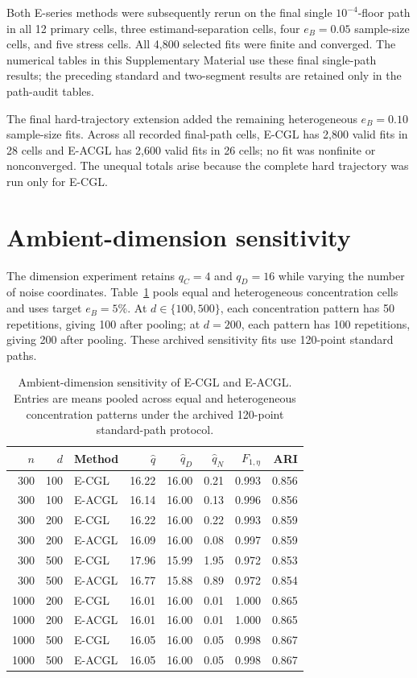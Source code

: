 \documentclass[preprint,12pt,authoryear]{elsarticle}
\begin{document}
Both E-series methods were subsequently rerun on the final single
$10^{-4}$-floor path in all 12 primary cells, three estimand-separation cells,
four $e_B=0.05$ sample-size cells, and five stress cells. All 4,800 selected
fits were finite and converged. The numerical tables in this Supplementary Material use
these final single-path results; the preceding standard and two-segment
results are retained only in the path-audit tables.

The final hard-trajectory extension added the remaining heterogeneous
$e_B=0.10$ sample-size fits. Across all recorded final-path cells, E-CGL has
2,800 valid fits in 28 cells and E-ACGL has 2,600 valid fits in 26 cells; no
fit was nonfinite or nonconverged. The unequal totals arise because the
complete hard trajectory was run only for E-CGL.

\section{Ambient-dimension sensitivity}
\label{sec:s-ambient-dimension}

The dimension experiment retains $q_C=4$ and $q_D=16$ while varying the number
of noise coordinates. Table~\ref{tab:s-ambient-dimension} pools equal and heterogeneous
concentration cells and uses target $e_B=5\%$. At $d\in\{100,500\}$, each
concentration pattern has 50 repetitions, giving 100 after pooling; at $d=200$,
each pattern has 100 repetitions, giving 200 after pooling. These archived
sensitivity fits use 120-point standard paths.

\begin{table}[H]
\centering
\footnotesize
\setlength{\tabcolsep}{3pt}
\caption{Ambient-dimension sensitivity of E-CGL and E-ACGL. Entries are means
pooled across equal and heterogeneous concentration patterns under the
archived 120-point standard-path protocol.}
\label{tab:s-ambient-dimension}
\begin{tabular}{rrlrrrrr}
\toprule
$n$ & $d$ & Method & $\widehat q$ & $\widehat q_D$ & $\widehat q_N$ & $F_{1,\eta}$ & ARI \\
\midrule
300 & 100 & E-CGL & 16.22 & 16.00 & 0.21 & 0.993 & 0.856 \\
300 & 100 & E-ACGL & 16.14 & 16.00 & 0.13 & 0.996 & 0.856 \\
300 & 200 & E-CGL & 16.22 & 16.00 & 0.22 & 0.993 & 0.859 \\
300 & 200 & E-ACGL & 16.09 & 16.00 & 0.08 & 0.997 & 0.859 \\
300 & 500 & E-CGL & 17.96 & 15.99 & 1.95 & 0.972 & 0.853 \\
300 & 500 & E-ACGL & 16.77 & 15.88 & 0.89 & 0.972 & 0.854 \\
1000 & 200 & E-CGL & 16.01 & 16.00 & 0.01 & 1.000 & 0.865 \\
1000 & 200 & E-ACGL & 16.01 & 16.00 & 0.01 & 1.000 & 0.865 \\
1000 & 500 & E-CGL & 16.05 & 16.00 & 0.05 & 0.998 & 0.867 \\
1000 & 500 & E-ACGL & 16.05 & 16.00 & 0.05 & 0.998 & 0.867 \\
\bottomrule
\end{tabular}
\end{table}
\end{document}

